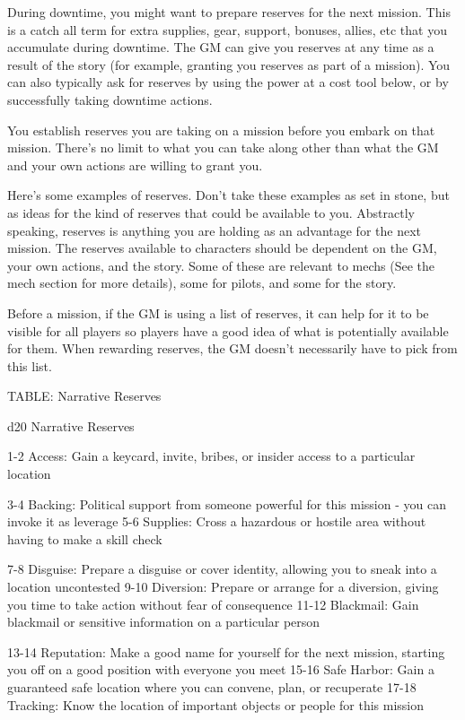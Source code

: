 During downtime, you might want to prepare reserves for the next mission. This is a catch all
term for extra supplies, gear, support, bonuses, allies, etc that you accumulate during downtime.
The GM can give you reserves at any time as a result of the story (for example, granting you
reserves as part of a mission). You can also typically ask for reserves by using the power at a
cost tool below, or by successfully taking downtime actions.


You establish reserves you are taking on a mission before you embark on that mission. There’s
no limit to what you can take along other than what the GM and your own actions are willing to
grant you.


Here’s some examples of reserves. Don’t take these examples as set in stone, but as ideas for
the kind of reserves that could be available to you. Abstractly speaking, reserves is anything
you are holding as an advantage for the next mission. The reserves available to characters
should be dependent on the GM, your own actions, and the story. Some of these are relevant to
mechs (See the mech section for more details), some for pilots, and some for the story.


Before a mission, if the GM is using a list of reserves, it can help for it to be visible for all
players so players have a good idea of what is potentially available for them. When rewarding
reserves, the GM doesn’t necessarily have to pick from this list.


TABLE: Narrative Reserves




 d20       Narrative	Reserves

  1-2      Access: Gain a keycard, invite, bribes, or insider access to a particular location

  3-4      Backing: Political support from someone powerful for this mission - you can invoke it
           as leverage
  5-6      Supplies: Cross a hazardous or hostile area without having to make a skill check

  7-8      Disguise: Prepare a disguise or cover identity, allowing you to sneak into a location
           uncontested
 9-10      Diversion: Prepare or arrange for a diversion, giving you time to take action without
           fear of consequence
   11-12   Blackmail: Gain blackmail or sensitive information on a particular person

   13-14   Reputation: Make a good name for yourself for the next mission, starting you off on a
           good position with everyone you meet
   15-16   Safe Harbor: Gain a guaranteed safe location where you can convene, plan, or
           recuperate
   17-18   Tracking: Know the location of important objects or people for this mission

